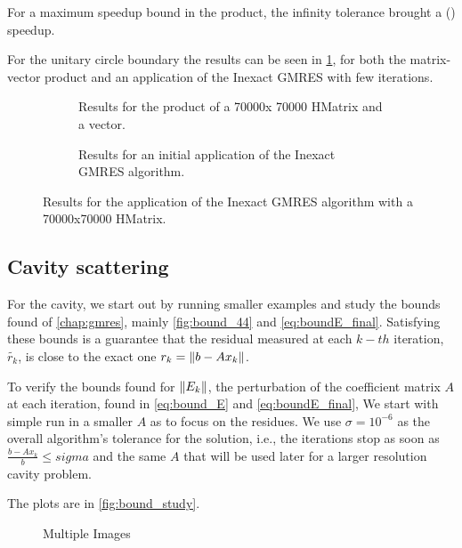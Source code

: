 For a maximum speedup bound in the product, the infinity tolerance brought a () speedup.

For the unitary circle boundary the results can be seen in \ref{fig:Helmholtz_circle_results}, for both the matrix-vector product and an application of the Inexact GMRES with few iterations.

\begin{figure}[h!]
    \centering
    \begin{subfigure}[b]{0.45\linewidth}
        
        \caption{Results for the product of a 70000x 70000 HMatrix and a vector.}
    \end{subfigure}
    \begin{subfigure}[b]{0.45\linewidth}
        
        \caption{Results for an initial application of the Inexact GMRES algorithm.}
    \end{subfigure}
    \caption{Results for the application of the Inexact GMRES algorithm with a 70000x70000 HMatrix.}
    \label{fig:Helmholtz_circle_results}
\end{figure}

\subsection{Cavity scattering}

For the cavity, we start out by running smaller examples and study the bounds found of \autoref{chap:gmres}, mainly \ref{fig:bound_44} and \ref{eq:boundE_final}. Satisfying these bounds is a guarantee that the residual measured at each $k-th$ iteration, $\tilde{r_{k}}$, is close to the exact one $r_{k} = \left\lVert b-Ax_{k}\right\rVert$.

To verify the bounds found for $\left\lVert E_{k}\right\rVert$, the perturbation of the coefficient matrix $A$ at each iteration, found in \ref{eq:bound_E} and \ref{eq:boundE_final}, We start with simple run in a smaller $A$ as to focus on the residues. We use $\sigma = 10^{-6}$ as the overall algorithm's tolerance for the solution, i.e., the iterations stop as soon as $\frac{b - Ax_{k}}{b} \leq sigma$ and the same $A$ that will be used later for a larger resolution cavity problem.

The plots are in \autoref{fig:bound_study}.

\begin{figure}[h!]
    \centering
    \begin{subfigure}[b]{0.45\linewidth}
        
    \end{subfigure}
    \begin{subfigure}[b]{0.45\linewidth}
        
    \end{subfigure}
    \caption{Multiple Images}
    \label{fig:multiple_figs}
\end{figure}


